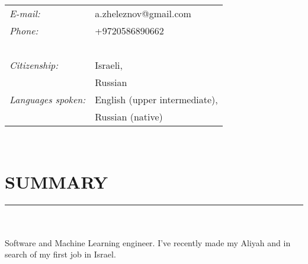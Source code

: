 \documentclass[a4paper,oneside,12pt]{article}
\newcommand{\cvpart}[1]{%
\vspace{-0.9em}%
\section*{\Large\bfseries\MakeTextUppercase{#1}}%
\vspace{-1.7em}%
\rule{\linewidth}{0.3em}\\[-0.8em]%
}
\begin{document}
\begin{centering}
\begin{minipage}{0.70\linewidth}%
\vspace{-1em}{\Huge\bfseries Alexander Zheleznov}

~\\[-1.5em]

\hspace{1.9em}\begin{tabularx}{\linewidth}{ll}
{\it E-mail:}		& a.zheleznov@gmail.com\\
{\it Phone:}	        & +9720586890662 \\

~\\[-1.0em]
{\it Citizenship:} & Israeli,\\ 
               & Russian \\
{\it Languages spoken:}& English (upper intermediate),\\ 
		       &Russian (native)\\
\end{tabularx}
\end{minipage}
\begin{minipage}{0.23\linewidth}%
\begin{flushright}
\end{flushright}
\end{minipage}
\end{centering}
~\\[1.5em]


\cvpart{Summary}
~\\[1.5em]
Software and Machine Learning engineer.
I've recently made my Aliyah and in search of my first job in Israel.
\end{document}
